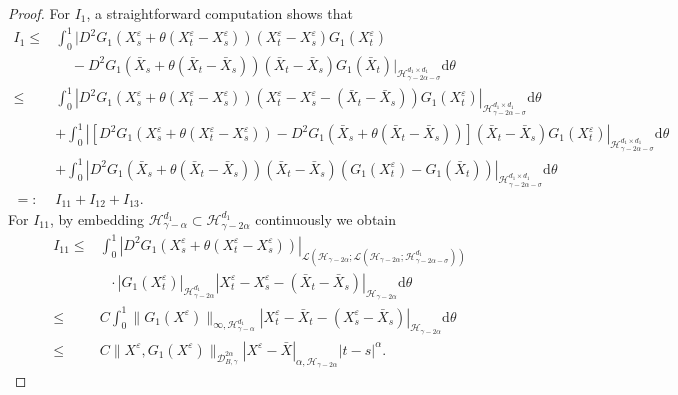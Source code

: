 \documentclass[10pt,a4paper]{amsart}
\begin{document}
\begin{proof}
	
	For $I_1$, a straightforward computation shows that
	\begin{align*}%
		I_1 \leq &  \int_0^1 \big|D^2 G_1 (X_s^\varepsilon+\theta(X_t^\varepsilon-X_s^\varepsilon)) (X_t^\varepsilon-X_s^\varepsilon)G_1(X_t^\varepsilon)\\
&~~~~~-D^2 G_1(\bar{X}_s+\theta(\bar{X}_t-\bar{X}_s)) (\bar{X}_t-\bar{X}_s) G_1(\bar{X}_t) \big|_{\mathcal H_{\gamma-2\alpha-\sigma}^{d_1 \times d_1}} \mathrm{d} \theta \nonumber\\
		\leq & \int_0^1 \left|D^2 G_1 (X_s^\varepsilon+\theta(X_t^\varepsilon-X_s^\varepsilon))(X_t^\varepsilon-X_s^\varepsilon-(\bar{X}_t-\bar{X}_s)) G_1(X_t^\varepsilon) \right|_{\mathcal H_{\gamma-2\alpha-\sigma}^{d_1 \times d_1}} \mathrm{d} \theta \nonumber\\
		&+\int_0^1 \left|[D^2 G_1 (X_s^\varepsilon+\theta(X_t^\varepsilon-X_s^\varepsilon))-D^2 G_1(\bar{X}_s+\theta(\bar{X}_t-\bar{X}_s))] (\bar{X}_t-\bar{X}_s) G_1(X_t^\varepsilon) \right|_{\mathcal H_{\gamma-2\alpha-\sigma}^{d_1 \times d_1}} \mathrm{d} \theta \nonumber\\
		&+\int_0^1 \left| D^2 G_1(\bar{X}_s+\theta(\bar{X}_t-\bar{X}_s)) (\bar{X}_t-\bar{X}_s) (G_1(X_t^\varepsilon)-G_1(\bar{X}_t)) \right|_{\mathcal H_{\gamma-2\alpha-\sigma}^{d_1 \times d_1}} \mathrm{d} \theta \nonumber\\
		=: & I_{11}+I_{12}+I_{13}.
	\end{align*}
	For $I_{11}$, by embedding $\mathcal H_{\gamma-\alpha}^{d_1} \subset \mathcal H_{\gamma-2\alpha}^{d_1}$ continuously we obtain
	\begin{align}\label{I11}
		I_{11} \leq & \int_0^1 |D^2 G_1 (X_s^\varepsilon+\theta(X_t^\varepsilon-X_s^\varepsilon))|_{\mathcal L (\mathcal H_{\gamma-2\alpha}; \mathcal L (\mathcal H_{\gamma-2\alpha}; \mathcal H_{\gamma-2\alpha-\sigma}^{d_1 }))} \nonumber\\
		&~~~\cdot
		|G_1(X_t^\varepsilon)|_{\mathcal H_{\gamma-2\alpha}^{d_1}} |X_t^\varepsilon-X_s^\varepsilon-(\bar{X}_t-\bar{X}_s)|_{\mathcal H_{\gamma-2\alpha}} \mathrm{d} \theta \nonumber\\
		\leq & C \int_0^1 \|G_1(X^\varepsilon)\|_{\infty,\mathcal H_{\gamma-\alpha}^{d_1}} |X_t^\varepsilon-\bar{X}_t-(X_s^\varepsilon-\bar{X}_s)|_{\mathcal H_{\gamma-2\alpha}} \mathrm{d} \theta \nonumber\\
		\leq & C  \|X^\varepsilon, G_1(X^\varepsilon)\|_{\mathcal D_{B,\gamma}^{2\alpha}} |X^\varepsilon-\bar{X}|_{\alpha, \mathcal H_{\gamma-2\alpha}} |t-s|^\alpha  .
	\end{align}	

\end{proof}
\end{document}
